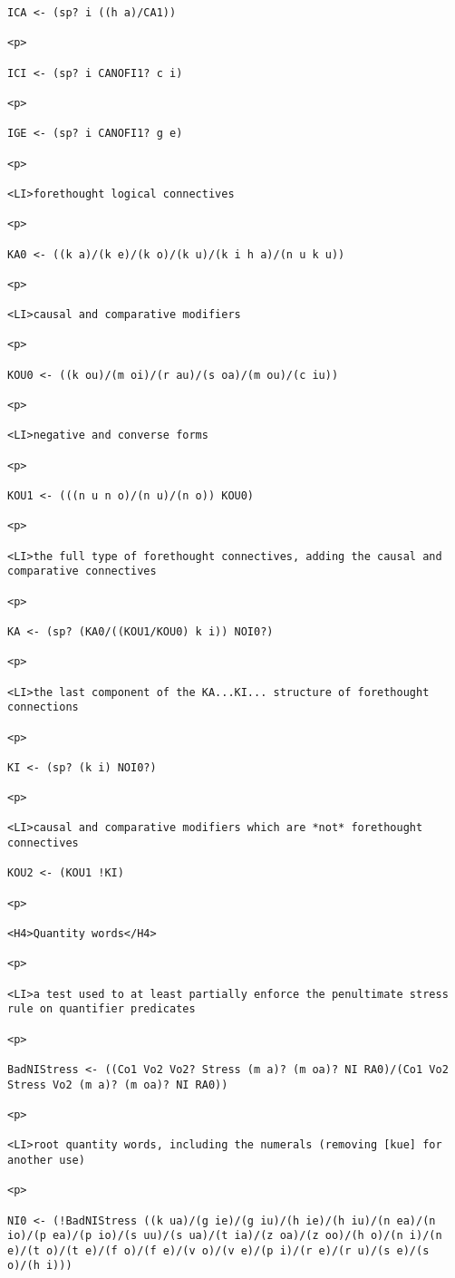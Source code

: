 \documentclass[12pt]{article}
\begin{document}
\begin{lstlisting}
ICA <- (sp? i ((h a)/CA1))

<p>

ICI <- (sp? i CANOFI1? c i)

<p>

IGE <- (sp? i CANOFI1? g e)

<p>

<LI>forethought logical connectives

<p>

KA0 <- ((k a)/(k e)/(k o)/(k u)/(k i h a)/(n u k u))

<p>

<LI>causal and comparative modifiers

<p>

KOU0 <- ((k ou)/(m oi)/(r au)/(s oa)/(m ou)/(c iu))

<p>

<LI>negative and converse forms

<p>

KOU1 <- (((n u n o)/(n u)/(n o)) KOU0)

<p>

<LI>the full type of forethought connectives, adding the causal and comparative connectives

<p>

KA <- (sp? (KA0/((KOU1/KOU0) k i)) NOI0?)

<p>

<LI>the last component of the KA...KI... structure of forethought connections

<p>

KI <- (sp? (k i) NOI0?)

<p>

<LI>causal and comparative modifiers which are *not* forethought connectives

KOU2 <- (KOU1 !KI)

<p>

<H4>Quantity words</H4>

<p>

<LI>a test used to at least partially enforce the penultimate stress rule on quantifier predicates

<p>

BadNIStress <- ((Co1 Vo2 Vo2? Stress (m a)? (m oa)? NI RA0)/(Co1 Vo2 Stress Vo2 (m a)? (m oa)? NI RA0))

<p>

<LI>root quantity words, including the numerals (removing [kue] for another use)

<p>

NI0 <- (!BadNIStress ((k ua)/(g ie)/(g iu)/(h ie)/(h iu)/(n ea)/(n io)/(p ea)/(p io)/(s uu)/(s ua)/(t ia)/(z oa)/(z oo)/(h o)/(n i)/(n e)/(t o)/(t e)/(f o)/(f e)/(v o)/(v e)/(p i)/(r e)/(r u)/(s e)/(s o)/(h i)))


\end{lstlisting}
\end{document}

